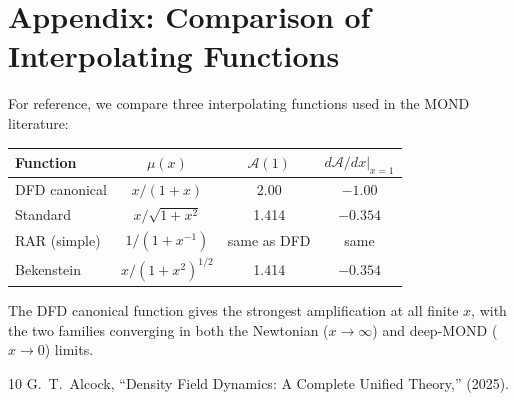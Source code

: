 \documentclass[aps,prd,twocolumn,superscriptaddress,nofootinbib]{revtex4-2}
\begin{document}
\section{Appendix: Comparison of Interpolating Functions}\label{sec:appendix-mu}

For reference, we compare three interpolating functions used in the
MOND literature:

\begin{center}
\begin{tabular}{lccc}
\toprule
Function & $\mu(x)$ & $\mathcal{A}(1)$ & $d\mathcal{A}/dx|_{x=1}$ \\
\midrule
DFD canonical & $x/(1+x)$ & 2.00 & $-1.00$ \\
Standard & $x/\sqrt{1+x^2}$ & 1.414 & $-0.354$ \\
RAR (simple) & $1/(1+x^{-1})$ & same as DFD & same \\
Bekenstein & $x/(1+x^2)^{1/2}$ & 1.414 & $-0.354$ \\
\bottomrule
\end{tabular}
\end{center}

The DFD canonical function gives the strongest amplification at all
finite $x$, with the two families converging in both the Newtonian
($x \to \infty$) and deep-MOND ($x \to 0$) limits.

\begin{thebibliography}{10}
 G.~T.~Alcock, ``Density Field Dynamics: A Complete
Unified Theory,'' (2025).
\end{thebibliography}
\end{document}
